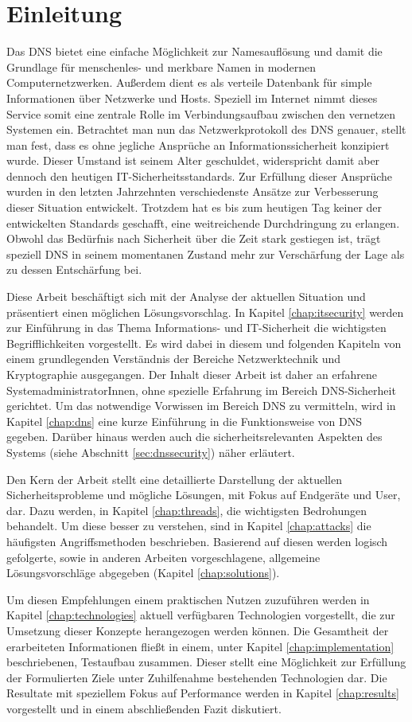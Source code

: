 \chapter{Einleitung}
Das \ac{DNS} bietet eine einfache Möglichkeit zur Namesauflösung und damit die Grundlage für menschenles- und merkbare Namen in modernen Computernetzwerken. Außerdem dient es als verteile Datenbank für simple Informationen über Netzwerke und Hosts. Speziell im Internet nimmt dieses Service somit eine zentrale Rolle im Verbindungsaufbau zwischen den vernetzen Systemen ein. Betrachtet man nun das Netzwerkprotokoll des DNS genauer, stellt man fest, dass es ohne jegliche Ansprüche an Informationssicherheit konzipiert wurde. Dieser Umstand ist seinem Alter geschuldet, widerspricht damit aber dennoch den heutigen IT-Sicherheitsstandards. Zur Erfüllung dieser Ansprüche wurden in den letzten Jahrzehnten verschiedenste Ansätze zur Verbesserung dieser Situation entwickelt. Trotzdem hat es bis zum heutigen Tag keiner der entwickelten Standards geschafft, eine weitreichende Durchdringung zu erlangen. Obwohl das Bedürfnis nach Sicherheit über die Zeit stark gestiegen ist, trägt speziell DNS in seinem momentanen Zustand mehr zur Verschärfung der Lage als zu dessen Entschärfung bei.

Diese Arbeit beschäftigt sich mit der Analyse der aktuellen Situation und präsentiert einen möglichen Lösungsvorschlag. In Kapitel \ref{chap:itsecurity} werden zur Einführung in das Thema Informations- und IT-Sicherheit die wichtigsten Begrifflichkeiten vorgestellt. Es wird dabei in diesem und folgenden Kapiteln von einem grundlegenden Verständnis der Bereiche Netzwerktechnik und Kryptographie ausgegangen. Der Inhalt dieser Arbeit ist daher an erfahrene SystemadministratorInnen, ohne spezielle Erfahrung im Bereich DNS-Sicherheit gerichtet. Um das notwendige Vorwissen im Bereich DNS zu vermitteln, wird in Kapitel \ref{chap:dns} eine kurze Einführung in die Funktionsweise von DNS gegeben. Darüber hinaus werden auch die sicherheitsrelevanten Aspekten des Systems (siehe Abschnitt \ref{sec:dnssecurity}) näher erläutert. 

Den Kern der Arbeit stellt eine detaillierte Darstellung der aktuellen Sicherheitsprobleme und mögliche Lösungen, mit Fokus auf Endgeräte und User, dar. Dazu werden, in Kapitel \ref{chap:threads}, die wichtigsten Bedrohungen behandelt. Um diese besser zu verstehen, sind in Kapitel \ref{chap:attacks} die häufigsten Angriffsmethoden beschrieben. Basierend auf diesen werden logisch gefolgerte, sowie in anderen Arbeiten vorgeschlagene, allgemeine Lösungsvorschläge abgegeben (Kapitel \ref{chap:solutions}). 

Um diesen Empfehlungen einem praktischen Nutzen zuzuführen werden in Kapitel \ref{chap:technologies} aktuell verfügbaren Technologien vorgestellt, die zur Umsetzung dieser Konzepte herangezogen werden können. Die Gesamtheit der erarbeiteten Informationen fließt in einem, unter Kapitel \ref{chap:implementation} beschriebenen, Testaufbau zusammen. Dieser stellt eine Möglichkeit zur Erfüllung der Formulierten Ziele unter Zuhilfenahme bestehenden Technologien dar. Die Resultate mit speziellem Fokus auf Performance werden in Kapitel \ref{chap:results} vorgestellt und in einem abschließenden Fazit diskutiert.
